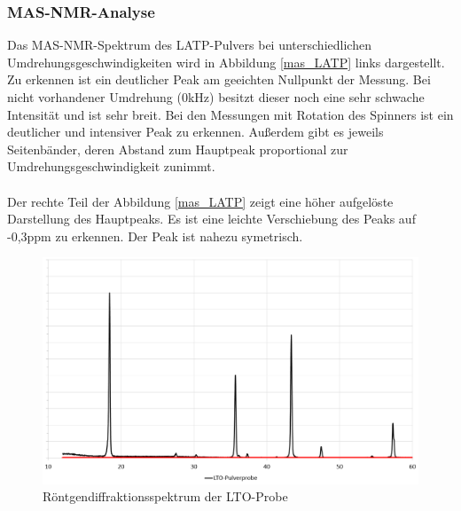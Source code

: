 \documentclass[a4paper, 11pt, headsepline,footsepline,twoside,abstract]{scrbook}
\begin{document}
\subsubsection{MAS-NMR-Analyse}
Das MAS-NMR-Spektrum des LATP-Pulvers bei unterschiedlichen Umdrehungsgeschwindigkeiten wird in Abbildung \ref{mas_LATP} links dargestellt. Zu erkennen ist ein deutlicher Peak am geeichten Nullpunkt der Messung. Bei nicht vorhandener Umdrehung (0kHz) besitzt dieser noch eine sehr schwache Intensität und ist sehr breit. Bei den Messungen mit Rotation des Spinners ist ein deutlicher und intensiver Peak zu erkennen. Außerdem gibt es jeweils Seitenbänder, deren Abstand zum Hauptpeak proportional zur Umdrehungsgeschwindigkeit zunimmt.
\\\\
Der rechte Teil der Abbildung \ref{mas_LATP} zeigt eine höher aufgelöste Darstellung des Hauptpeaks. Es ist eine leichte Verschiebung des Peaks auf -0,3ppm zu erkennen. Der Peak ist nahezu symetrisch. 
\newpage
\begin{figure}
	\centering
	\includegraphics[width=1.0\columnwidth]{images/XRD_LTO.png}
	\caption{Röntgendiffraktionsspektrum der LTO-Probe}
	\label{xrd_LTO}
\end{figure}
\end{document}
